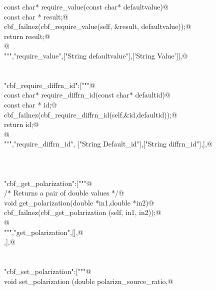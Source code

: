 \documentclass[10pt,a4paper,twoside,notitlepage]{article}
\begin{document}
\begin{flushleft}
\begin{minipage}{\linewidth}
\begin{list}{}{}
\mbox{}\verb@   const char* require_value(const char* defaultvalue){@\\
\mbox{}\verb@     const char * result;@\\
\mbox{}\verb@     cbf_failnez(cbf_require_value(self, &result, defaultvalue));@\\
\mbox{}\verb@     return result;@\\
\mbox{}\verb@    }@\\
\mbox{}\verb@""","require_value",["String defaultvalue"],['String Value']],@\\
\mbox{}\verb@@\\
\mbox{}\verb@@\\
\mbox{}\verb@"cbf_require_diffrn_id":["""@\\
\mbox{}\verb@   const char* require_diffrn_id(const char* defaultid){@\\
\mbox{}\verb@     const char * id;@\\
\mbox{}\verb@     cbf_failnez(cbf_require_diffrn_id(self,&id,defaultid));@\\
\mbox{}\verb@     return id;@\\
\mbox{}\verb@     }@\\
\mbox{}\verb@""","require_diffrn_id", ["String Default_id"],["String diffrn_id"],],@\\
\mbox{}\verb@@\\
\mbox{}\verb@@\\
\mbox{}\verb@@\\
\mbox{}\verb@"cbf_get_polarization":["""@\\
\mbox{}\verb@     /* Returns a pair of double values */@\\
\mbox{}\verb@%apply double *OUTPUT { double *in1, double *in2 };@\\
\mbox{}\verb@     void get_polarization(double *in1,double *in2){@\\
\mbox{}\verb@        cbf_failnez(cbf_get_polarization (self, in1, in2));@\\
\mbox{}\verb@     }@\\
\mbox{}\verb@""","get_polarization",[],@\\
\mbox{},],@\\
\mbox{}\verb@@\\
\mbox{}\verb@@\\
\mbox{}\verb@"cbf_set_polarization":["""@\\
\mbox{}\verb@     void set_polarization (double polarizn_source_ratio,@\\

\end{list}
\end{minipage}
\end{flushleft}
\end{document}
